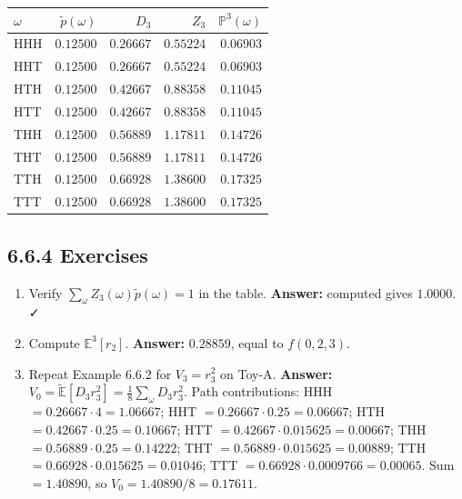 \documentclass[
  10pt,
  twoside]{book}
\newcounter{none} %
\providecommand{\tightlist}{%
  \setlength{\itemsep}{0pt}\setlength{\parskip}{0pt}}
\begin{document}
{\def\LTcaptype{none} %
\begin{table}[H]
\centering
\begin{tabular}{|l|r|r|r|r|}
\toprule
\(\omega\) & \(\tilde p(\omega)\) & \(D_3\) & \(Z_3\) & \(\mathbb P^3(\omega)\) \\
\midrule



HHH & \(0.12500\) & \(0.26667\) & \(0.55224\) & \(0.06903\) \\
HHT & \(0.12500\) & \(0.26667\) & \(0.55224\) & \(0.06903\) \\
HTH & \(0.12500\) & \(0.42667\) & \(0.88358\) & \(0.11045\) \\
HTT & \(0.12500\) & \(0.42667\) & \(0.88358\) & \(0.11045\) \\
THH & \(0.12500\) & \(0.56889\) & \(1.17811\) & \(0.14726\) \\
THT & \(0.12500\) & \(0.56889\) & \(1.17811\) & \(0.14726\) \\
TTH & \(0.12500\) & \(0.66928\) & \(1.38600\) & \(0.17325\) \\
TTT & \(0.12500\) & \(0.66928\) & \(1.38600\) & \(0.17325\) \\
\bottomrule
\end{tabular}
\end{table}
}

\subsection{6.6.4 Exercises}\label{exercises-32}

\begin{enumerate}
\def\labelenumi{\arabic{enumi}.}
\tightlist
\item
  Verify \(\sum_\omega Z_3(\omega) \tilde p(\omega) = 1\) in the table.
  \textbf{Answer:} computed gives \(1.0000\). ✓
\item
  Compute \(\mathbb E^3[r_2]\). \textbf{Answer:} \(0.28859\), equal to
  \(f(0, 2, 3)\).
\item
  Repeat Example 6.6.2 for \(V_3 = r_3^2\) on Toy-A. \textbf{Answer:}
  \(V_0 = \tilde{\mathbb E}[D_3 r_3^2] = \tfrac{1}{8}\sum_\omega D_3 r_3^2\).
  Path contributions: HHH \(= 0.26667\cdot 4 = 1.06667\); HHT
  \(= 0.26667\cdot 0.25 = 0.06667\); HTH
  \(= 0.42667\cdot 0.25 = 0.10667\); HTT
  \(= 0.42667\cdot 0.015625 = 0.00667\); THH
  \(= 0.56889\cdot 0.25 = 0.14222\); THT
  \(= 0.56889\cdot 0.015625 = 0.00889\); TTH
  \(= 0.66928\cdot 0.015625 = 0.01046\); TTT
  \(= 0.66928\cdot 0.0009766 = 0.00065\). Sum \(= 1.40890\), so
  \(V_0 = 1.40890/8 = 0.17611\).
\end{enumerate}
\end{document}
